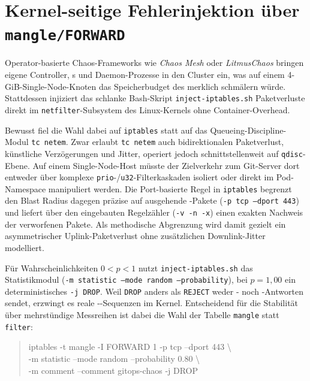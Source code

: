 \section{Kernel-seitige Fehlerinjektion über \texttt{mangle/FORWARD}}
\label{sec:deterministische-fehlerinjektion}

Operator-basierte Chaos-Frameworks wie \textit{Chaos Mesh} oder \textit{LitmusChaos} bringen eigene Controller, s und Daemon-Prozesse in den Cluster ein,\autocite{chaos_mesh_2026,litmuschaos_2026} was auf einem 4-GiB-Single-Node-Knoten das Speicherbudget des  merklich schmälern würde. Stattdessen injiziert das schlanke Bash-Skript \texttt{inject-iptables.sh} Paketverluste direkt im \texttt{netfilter}-Subsystem des Linux-Kernels ohne Container-Overhead.\autocite{iptables_man_2026}

Bewusst fiel die Wahl dabei auf \texttt{iptables} statt auf das Queueing-Discipline-Modul \texttt{tc netem}.\autocite{tc_netem_2026} Zwar erlaubt \texttt{tc netem} auch bidirektionalen Paketverlust, künstliche Verzögerungen und Jitter, operiert jedoch schnittstellenweit auf \texttt{qdisc}-Ebene. Auf einem Single-Node-Host müsste der Zielverkehr zum Git-Server dort entweder über komplexe \texttt{prio}-/\texttt{u32}-Filterkaskaden isoliert oder direkt im Pod-Namespace manipuliert werden. Die Port-basierte Regel in \texttt{iptables} begrenzt den Blast Radius dagegen präzise auf ausgehende -Pakete (\texttt{-p tcp --dport 443}) und liefert über den eingebauten Regelzähler (\texttt{-v -n -x}) einen exakten Nachweis der verworfenen Pakete. Als methodische Abgrenzung wird damit gezielt ein asymmetrischer Uplink-Paketverlust ohne zusätzlichen Downlink-Jitter modelliert.

Für Wahrscheinlichkeiten $0 < p < 1$ nutzt \texttt{inject-iptables.sh} das Statistikmodul (\texttt{-m statistic --mode random --probability}), bei $p = 1{,}00$ ein deterministisches \texttt{-j DROP}.\autocite{iptables_ext_2026} Weil \texttt{DROP} anders als \texttt{REJECT} weder - noch -Antworten sendet, erzwingt es reale --Sequenzen im Kernel. Entscheidend für die Stabilität über mehrstündige Messreihen ist dabei die Wahl der Tabelle \texttt{mangle} statt \texttt{filter}:

\begin{quote}
\raggedright\ttfamily\footnotesize
iptables -t mangle -I FORWARD 1 -p tcp --dport 443 \textbackslash\\
\quad -m statistic --mode random --probability 0.80 \textbackslash\\
\quad -m comment --comment \textquotedbl{}gitops-chaos\textquotedbl{} -j DROP
\end{quote}


